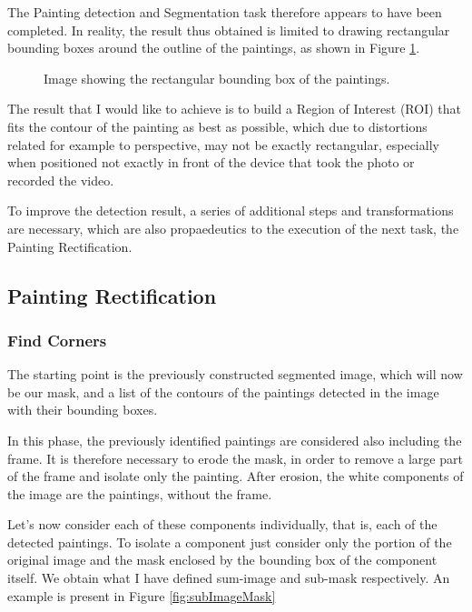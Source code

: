 \documentclass[10pt,twocolumn,letterpaper]{article}
\begin{document}
The Painting detection and Segmentation task therefore appears to have been completed. In reality, the result thus obtained is limited to drawing rectangular bounding boxes around the outline of the paintings, as shown in Figure \ref{fig:imageRectROI}.

\begin{figure}[t]
   \begin{center}
   \fbox{\rule{0pt}{2in} \rule{0.9\linewidth}{0pt}}
   \end{center}
      \caption{Image showing the rectangular bounding box of the paintings.}
   \label{fig:imageRectROI}
\end{figure}

The result that I would like to achieve is to build a Region of Interest (ROI) that fits the contour of the painting as best as possible, which due to distortions related for example to perspective, may not be exactly rectangular, especially when positioned not exactly in front of the device that took the photo or recorded the video.

To improve the detection result, a series of additional steps and transformations are necessary, which are also propaedeutics
to the execution of the next task, the Painting Rectification.

\subsection{Painting Rectification}

\subsubsection{Find Corners}

The starting point is the previously constructed segmented image, which will now be our mask, and a list of the contours of the paintings detected in the image with their bounding boxes.

In this phase, the previously identified paintings are considered also including the frame. It is therefore necessary to erode the mask, in order to remove a large part of the frame and isolate only the painting. After erosion, the white components of the image are the paintings, without the frame.

Let's now consider each of these components individually, that is, each of the detected paintings. To isolate a component just consider only the portion of the original image and the mask enclosed by the bounding box of the component itself. We obtain what I have defined sum-image and sub-mask respectively. An example is present in Figure \ref{fig:subImageMask}
\end{document}
